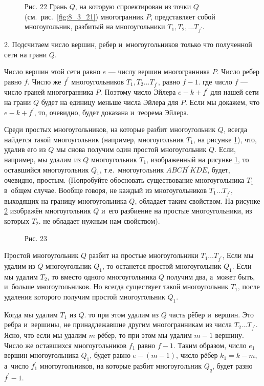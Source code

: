 \begin{figure}\label{fig:8_3_22}
\caption{Рис. 22 Грань $Q$, на которую спроектирован из точки $Q$
(см.\ рис.\ \ref{fig:8_3_21}) многогранник $P$, представляет собой многоугольник,
разбитый на многоугольники $T_{1}, T_{2}, \dots T_{f^{\prime}}$.}
\end{figure}


2. Подсчитаем число вершин, ребер и~многоугольников только что полученной
сети на грани $Q$.

Число вершин этой сети равно $e$ --- числу вершин многогранника $P$.
Число ребер равно $f$. Число же $f^{\prime}$ многоугольников
$T_{1}, T_{2} \dots T_{f^{\prime}}$‚ равно $f - 1$. где число $f$ --- число
граней многогранника $P$. Поэтому число Эйлера $e - k + f^{\prime}$ для
нашей сети на грани $Q$ будет на единицу меньше числа Эйлера для $P$.
Если мы докажем, что $e - k + f^{\prime}$, то, очевидно, будет
доказана и~теорема Эйлера.

Среди простых многоугольников, на которые разбит многоугольник $Q$, всегда
найдется такой многоугольник (например, многоугольник $T_{1}$, на рисунке
\ref{fig:8_3_22}), что, удалив его из $Q$ мы снова получим один простой
многоугольник $Q$. Если, например, мы удалим из $Q$ многоугольник $T_{1}$‚
изображенный на рисунке \ref{fig:8_3_22}, то оставшийся многоугольник $Q_{1}$,
т.е.\ многоугольник $ABCH^{\prime}KDE$, будет, очевидно, простым. (Попробуйте
обосновать существование многоугольника $T_{1}$ в~общем случае. Вообще говоря,
не каждый из многоугольников $T_{1} \dots T_{f^{\prime}}$‚ выходящих
на границу многоугольника $Q$, обладает таким свойством. На рисунке \ref{fig:8_3_23}
изображён многоугольник $Q$ и~его разбиение на простые многоугольники,
из которых $T_{2}$. не обладает нужным нам свойством).

\begin{figure}\label{fig:8_3_23}
\caption{Рис. 23}
\end{figure}

Простой многоугольник $Q$ разбит на простые многоугольники
$T_{1} \dots T_{f^{\prime}}$, Если мы удалим из $Q$ многоугольник $Q_{1}$‚
то останется простой многоугольник $Q_{1}$. Если мы удалим $T_{2}$, то вместо
одного многоугольника $Q$ получим два, а~может быть, и~больше многоугольников.
Но всегда существует такой многоугольник $T_{1}$‚ после удаления которого
получим простой многоугольник $Q_{1}$.

Когда мы удалим $T_{1}$ из $Q$. то при этом удалим из $Q$ часть рёбер и~вершин.
Это ребра и~вершины, не принадлежавшие другим многогранникам из числа
$T_{2} \dots T_{f^{\prime}}$. Ясно, что если мы удалим $m$ рёбер,
то при этом мы удалим $m - 1$ вершину. Число же оставшихся многоугольников
$f_{1}$ равно $f - 1$. Таким образом, число $e_{1}$ вершин многоугольника
$Q_{1}$, будет равно $e - (m - 1)$, число рёбер $k_{1} = k - m$,
а~число $f^{\prime}_{1}$ многоугольников, на которые разбит многоугольник
$Q_{q}$, будет разно $f^{\prime} - 1$.

